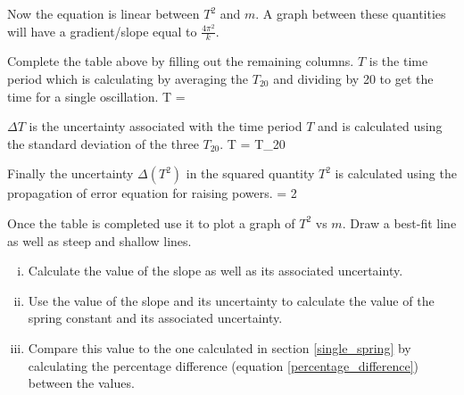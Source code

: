         Now the equation is linear between $T^2$ and $m$. A graph between these quantities will have a gradient/slope equal to $\displaystyle \frac{4 \pi^2}{k}$.

        Complete the table above by filling out the remaining columns. $T$ is the time period which is calculating by averaging the $T_{20}$ and dividing by 20 to get the time for a single oscillation.
        \beq
            T = 
        \eeq

        $\Delta T$ is the uncertainty associated with the time period $T$ and is calculated using the standard deviation of the three $T_{20}$.
        \beq
            \Delta T =  \Delta T_{20}
        \eeq

        Finally the uncertainty $\Delta (T^2)$ in the squared quantity $T^2$ is calculated using the propagation of error equation for raising powers.
        \beq
             = 2 
        \eeq

        Once the table is completed use it to plot a graph of $T^2$ vs $m$. Draw a best-fit line as well as steep and shallow lines.

        \begin{enumerate}[(i)]

            \item Calculate the value of the slope as well as its associated uncertainty.

            \item Use the value of the slope and its uncertainty to calculate the value of the spring constant and its associated uncertainty.

            \item Compare this value to the one calculated in section \ref{single_spring} by calculating the percentage difference (equation \eqref{percentage_difference}) between the values.

        \end{enumerate}
